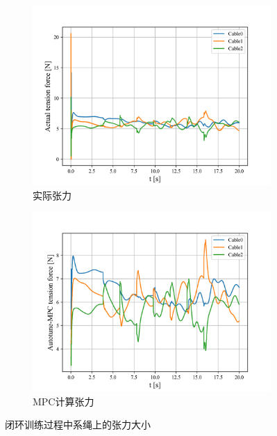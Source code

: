 \documentclass[lang=chs, degree=master, blindreview=true, winfonts=true]{yanputhesis}
\begin{document}
\begin{figure}[hbt!]
    \centering
    \begin{subfigure}[b]{0.48\textwidth}
        \centering
        \includegraphics[width=\textwidth]{picture/kk/cable_actual_tensions_fig_8_6quad_ol.png}
        \caption{实际张力}
    \end{subfigure}
    \hfill
    \begin{subfigure}[b]{0.48\textwidth}
        \centering
        \includegraphics[width=\textwidth]{picture/kk/cable_MPC_tensions_fig_8_6quad_ol.png}
        \caption{MPC计算张力}
    \end{subfigure}
	\caption{闭环训练过程中系绳上的张力大小} 	
	\label{cjb1}
\end{figure}
\end{document}
